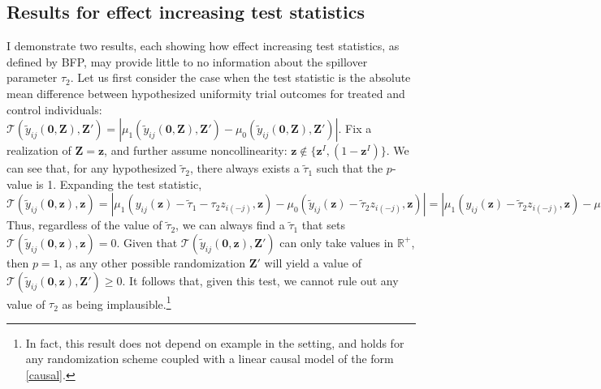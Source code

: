 \documentclass[12pt]{article}
\newcommand{\Z}{\mathbf{Z}}
\newcommand{\T}{\mathcal{T}}
\newcommand{\z}{\mathbf{z}}
\newcommand{\0}{\mathbf{0}}
\begin{document}


\subsection*{Results for effect increasing test statistics}

I demonstrate two results, each showing how effect increasing test statistics, as defined by BFP, may provide little to no information about the spillover parameter $\tau_2$. 
Let us first consider the case when the test statistic is the absolute mean difference between hypothesized uniformity trial outcomes for treated and control individuals: 
$\T(\widetilde y_{ij}(\0,\Z), \Z') = 
\left\vert \mu_1 ( \widetilde y_{ij}(\0,\Z), \Z' ) - \mu_0 ( \widetilde y_{ij}(\0,\Z), \Z' )
\right\vert.
$
Fix a realization of $\Z = \z$, and further assume noncollinearity: $ \z \notin \{\z^I, (1-\z^I)\}$. We can see that, for any hypothesized $\widetilde\tau_2$, there always exists a $\widetilde\tau_1$ such that the $p$-value is 1. Expanding the test statistic, 
$\T(\widetilde y_{ij}(\0,\z), \z) = 
\left\vert \mu_1 (y_{ij}(\z) - \widetilde\tau_1 - \tau_2 z_{i(-j)}, \z) - \mu_0(\widetilde y_{ij}(\z) - \widetilde\tau_2 z_{i(-j)} , \z)
\right\vert
=
\left\vert \mu_1 (y_{ij}(\z) - \widetilde\tau_2 z_{i(-j)}, \z)- \mu_0 (\widetilde y_{ij}(\z) - \widetilde\tau_2 z_{i(-j)}, \z)- \widetilde\tau_1 
\right\vert.
$ 
Thus, regardless of the value of $\widetilde\tau_2$, we can always find a $\widetilde\tau_1$ that sets $\T(\widetilde y_{ij}(\0,\z), \z) = 0$. Given that $\T(\widetilde y_{ij}(\0,\z), \Z')$ can only take values in $\mathbb{R}^+$, then $p=1$, as any other possible randomization $\Z'$ will yield a value of $\T(\widetilde y_{ij}(\0,\z), \Z') \geq 0$. It follows that, given this test, we cannot rule out any value of $\tau_2$ as being implausible.\footnote{In fact, this result does not depend on example in the setting, and holds for any randomization scheme coupled with a linear causal model of the form \eqref{causal}.}
\end{document}

